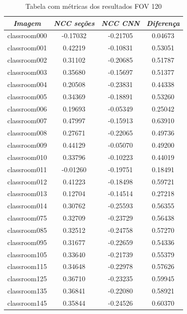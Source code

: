 \documentclass[cic,tc]{iiufrgs}
\begin{document}
\begin{table}[h]
    \caption{Tabela com métricas dos resultados FOV 120\degree}
    \centering
        \begin{tabular}{c|c|c|c}
          \hline
          \textit{Imagem} & \textit{NCC seções} & \textit{NCC CNN} & \textit{Diferença} \\
          \hline
          \hline
          classroom000 & -0.17032 & -0.21705 & 0.04673 \\
          classroom001 & 0.42219 & -0.10831 & 0.53051 \\
          classroom002 & 0.31102 & -0.20685 & 0.51787 \\
          classroom003 & 0.35680 & -0.15697 & 0.51377 \\
          classroom004 & 0.20508 & -0.23831 & 0.44338 \\
          classroom005 & 0.34369 & -0.18891 & 0.53260 \\
          classroom006 & 0.19693 & -0.05349 & 0.25042 \\
          classroom007 & 0.47997 & -0.15913 & 0.63910 \\
          classroom008 & 0.27671 & -0.22065 & 0.49736 \\
          classroom009 & 0.44129 & -0.05070 & 0.49200 \\
          classroom010 & 0.33796 & -0.10223 & 0.44019 \\
          classroom011 & -0.01260 & -0.19751 & 0.18491 \\
          classroom012 & 0.41223 & -0.18498 & 0.59721 \\
          classroom013 & 0.12704 & -0.14514 & 0.27218 \\
          classroom014 & 0.30762 & -0.25593 & 0.56355 \\
          classroom075 & 0.32709 & -0.23729 & 0.56438 \\
          classroom085 & 0.32512 & -0.24758 & 0.57270 \\
          classroom095 & 0.31677 & -0.22659 & 0.54336 \\
          classroom105 & 0.33640 & -0.21739 & 0.55379 \\
          classroom115 & 0.34648 & -0.22978 & 0.57626 \\
          classroom125 & 0.36710 & -0.23235 & 0.59945 \\
          classroom135 & 0.36841 & -0.22080 & 0.58921 \\
          classroom145 & 0.35844 & -0.24526 & 0.60370 \\

\end{tabular}
\end{table}
\end{document}
